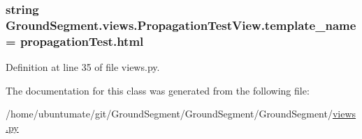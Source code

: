 \subsubsection[{template\+\_\+name}]{\setlength{\rightskip}{0pt plus 5cm}string Ground\+Segment.\+views.\+Propagation\+Test\+View.\+template\+\_\+name = \textquotesingle{}propagation\+Test.\+html\textquotesingle{}\hspace{0.3cm}{\ttfamily [static]}}\label{class_ground_segment_1_1views_1_1_propagation_test_view_acb9e74e46b3111efb6fe00c209e981fd}


Definition at line 35 of file views.\+py.



The documentation for this class was generated from the following file\+:\begin{DoxyCompactItemize}
\item 
/home/ubuntumate/git/\+Ground\+Segment/\+Ground\+Segment/\+Ground\+Segment/\hyperlink{views_8py}{views.\+py}\end{DoxyCompactItemize}
